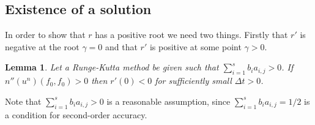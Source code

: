 \documentclass{article}
\newtheorem{lemma}[theorem]{Lemma}
\newcommand{\inner}[2]{\left< #1 , #2 \right>}
\begin{document}
\subsection{Existence of a solution}
In order to show that \(r\) has a positive root we need two things. Firstly that \(r'\) is negative at the root \(\gamma = 0\) and that \(r'\) is positive at some point \(\gamma > 0\).

    \begin{lemma}
        Let a Runge-Kutta method be given such that \(\sum_{i=1}^{s}b_{i}a_{i,j}>0\). If \(n''(u^n)(f_0,f_0) > 0\) then \(r'(0)<0\) for sufficiently small \(\Delta t > 0\).
    \end{lemma}

    \vspace*{5mm}
    Note that \(\sum_{i=1}^{s}b_{i}a_{i,j}>0\) is a reasonable assumption,
    since \(\sum_{i=1}^{s}b_{i}a_{i,j}=1/2\) is a condition for second-order accuracy.

\end{document}
